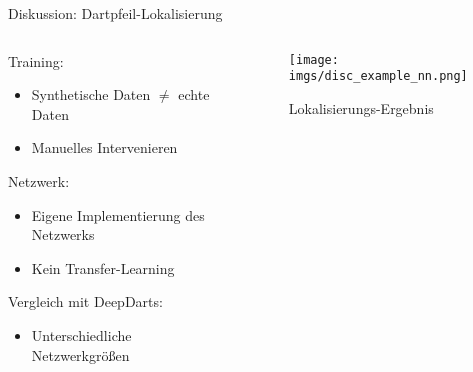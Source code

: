\begin{frame}{Diskussion: Dartpfeil-Lokalisierung}
    \begin{columns}
        \begin{column}{0.7\linewidth}

            Training:\\
            \begin{itemize}
                \item Synthetische Daten $\neq$ echte Daten
                \item Manuelles Intervenieren
            \end{itemize}

            Netzwerk:\\
            \begin{itemize}
                \item Eigene Implementierung des Netzwerks
                \item Kein Transfer-Learning
            \end{itemize}

            Vergleich mit DeepDarts:\\
            \begin{itemize}
                \item Unterschiedliche Netzwerkgrößen
            \end{itemize}

        \end{column}
        \begin{column}{0.3\linewidth}

            \begin{figure}
                \centering
                \texttt{[image: imgs/disc\_example\_nn.png]}
                \caption{Lokalisierungs-Ergebnis}
            \end{figure}

        \end{column}
    \end{columns}
\end{frame}
